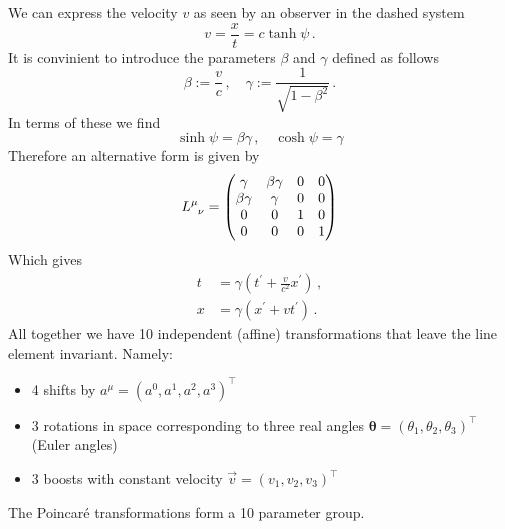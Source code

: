   We can express the velocity $v$ as seen by an observer in the dashed system
  \begin{equation}
  v=\frac{x}{t}=c\tanh\psi\,.
  \end{equation}
  It is convinient to introduce the parameters $\beta$ and $\gamma$ defined as
  follows
  \begin{equation}
  \beta:=\frac{v}{c}\, ,\quad\gamma:=\frac{1}{\sqrt{1-\beta^2}}\, .
  \end{equation}
  In terms of these we find
  \begin{equation}
  \sinh\psi = \beta\gamma\, , \quad \cosh\psi=\gamma
  \end{equation}
  Therefore an alternative form is given by
  \begin{equation}
  \tensor{L}{^\mu_\nu}=\begin{pmatrix}
  \gamma&\beta\gamma & 0&0\\
  \beta\gamma&\gamma &0&0\\
  0&0&1 &0\\
  0&0 &0 &1
  \end{pmatrix}
  \end{equation}
  Which gives 
  \begin{align}
  t&=\gamma\left(t^\prime+\frac{v}{c^2}x^\prime\right)\, ,\\
  x&=\gamma\left(x^\prime+vt^\prime\right)\, .
  \end{align}
All together we have 10 independent (affine) transformations that leave the line
element invariant. Namely:
\begin{itemize}
  \item 4 shifts by $a^\mu=(a^0,a^1,a^2,a^3)^\intercal$
  \item 3 rotations in space corresponding to three real angles
  $\boldsymbol{\theta}=(\theta_1,\theta_2,\theta_3)^\intercal$ (Euler angles)
  \item 3 boosts with constant velocity $\vec{v}=(v_1,v_2,v_3)^\intercal$
\end{itemize}
The Poincaré transformations form a 10 parameter group.
